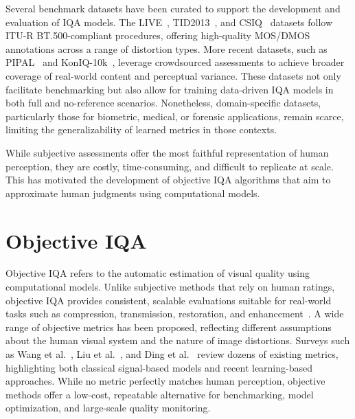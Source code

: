 Several benchmark datasets have been curated to support the development and evaluation of IQA models. The LIVE~\cite{sheikh2006image}, TID2013~\cite{pnsr2003}, and CSIQ~\cite{ma2011psnr} datasets follow ITU-R BT.500-compliant procedures, offering high-quality MOS/DMOS annotations across a range of distortion types. More recent datasets, such as PIPAL~\cite{jin2020pipal} and KonIQ-10k~\cite{mos2016}, leverage crowdsourced assessments to achieve broader coverage of real-world content and perceptual variance. These datasets not only facilitate benchmarking but also allow for training data-driven IQA models in both full and no-reference scenarios. Nonetheless, domain-specific datasets, particularly those for biometric, medical, or forensic applications, remain scarce, limiting the generalizability of learned metrics in those contexts.

While subjective assessments offer the most faithful representation of human perception, they are costly, time-consuming, and difficult to replicate at scale. This has motivated the development of objective IQA algorithms that aim to approximate human judgments using computational models.


\section{Objective IQA}\label{sec:objective_iqa}

Objective IQA refers to the automatic estimation of visual quality using computational models. Unlike subjective methods that rely on human ratings, objective IQA provides consistent, scalable evaluations suitable for real-world tasks such as compression, transmission, restoration, and enhancement~\cite{gonzalez2002digital, sheikh2006image}. A wide range of objective metrics has been proposed, reflecting different assumptions about the human visual system and the nature of image distortions. Surveys such as Wang et al.~\cite{wang2004image}, Liu et al.~\cite{liu2013mmf}, and Ding et al.~\cite{ding2020dists} review dozens of existing metrics, highlighting both classical signal-based models and recent learning-based approaches. While no metric perfectly matches human perception, objective methods offer a low-cost, repeatable alternative for benchmarking, model optimization, and large-scale quality monitoring.

